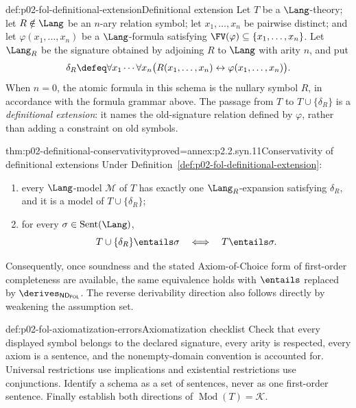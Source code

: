 \begin{hbdefinition}{def:p02-fol-definitional-extension}{Definitional extension}
Let \(T\) be a \(\Lang\)-theory; let \(R\notin\Lang\) be an \(n\)-ary
relation symbol; let \(x_1,\ldots,x_n\) be pairwise distinct; and let
\(\varphi(x_1,\ldots,x_n)\) be a \(\Lang\)-formula satisfying
\(\FV(\varphi)\subseteq\{x_1,\ldots,x_n\}\).  Let \(\Lang_R\) be the
signature obtained by adjoining \(R\) to \(\Lang\) with arity \(n\), and put
\[
 \delta_R\defeq\forall x_1\cdots\forall x_n
 \bigl(R(x_1,\ldots,x_n)\leftrightarrow
       \varphi(x_1,\ldots,x_n)\bigr).
\]
When \(n=0\), the atomic formula in this schema is the nullary symbol \(R\),
in accordance with the formula grammar above.
The passage from \(T\) to \(T\cup\{\delta_R\}\) is a
\emph{definitional extension}: it names the old-signature relation defined by
\(\varphi\), rather than adding a constraint on old symbols.
\end{hbdefinition}

\begin{hbtheorem}{thm:p02-definitional-conservativity}{proved=annex:p2.2.syn.11}{Conservativity of definitional extensions}
Under Definition~\ref{def:p02-fol-definitional-extension}:
\begin{enumerate}
 \item every \(\Lang\)-model \(\mathcal M\) of \(T\) has exactly one
 \(\Lang_R\)-expansion satisfying \(\delta_R\), and it is a model of
 \(T\cup\{\delta_R\}\);
 \item for every \(\sigma\in\operatorname{Sent}(\Lang)\),
 \[
  T\cup\{\delta_R\}\entails\sigma
  \quad\Longleftrightarrow\quad T\entails\sigma.
 \]
\end{enumerate}
Consequently, once soundness and the stated Axiom-of-Choice form of
first-order completeness are available, the same equivalence holds with
\(\entails\) replaced by
\(\derives_{\mathsf{ND}_{\mathsf{FOL}}}\).  The reverse derivability
direction also follows directly by weakening the assumption set.
\end{hbtheorem}

\begin{hbwarning}{def:p02-fol-axiomatization-errors}{Axiomatization checklist}
Check that every displayed symbol belongs to the declared signature, every
arity is respected, every axiom is a sentence, and the nonempty-domain
convention is accounted for.  Universal restrictions use implications and
existential restrictions use conjunctions.  Identify a schema as a set of
sentences, never as one first-order sentence.  Finally establish both
directions of \(\operatorname{Mod}(T)=\mathcal K\).
\end{hbwarning}
